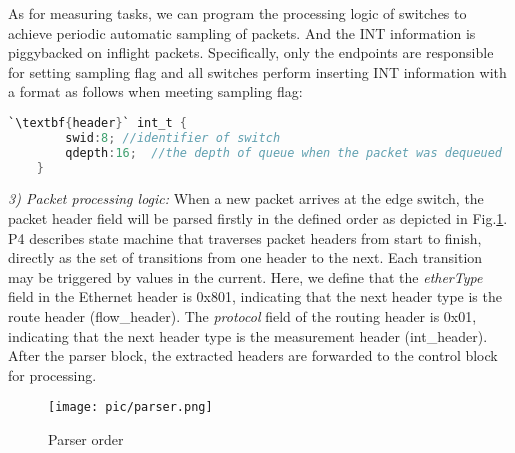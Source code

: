 \documentclass[10pt,conference]{IEEEtran}
\begin{document}
As for measuring tasks, we can program the processing logic of switches to achieve periodic automatic sampling of packets. And the INT information is piggybacked on inflight packets. Specifically, only the endpoints are responsible for setting sampling flag and all switches perform inserting INT information with a format as follows when meeting sampling flag:

\begin{lstlisting}[breaklines,columns=flexible,basicstyle=\footnotesize,language={C},tabsize=4,keywordstyle=\bfseries,stringstyle=\ttfamily,escapeinside=``,commentstyle=\color{red!50!green!50!blue!50},showstringspaces=false]
	`\textbf{header}` int_t {
		swid:8; //identifier of switch
		qdepth:16;	//the depth of queue when the packet was dequeued
	}
\end{lstlisting}

\emph{3) Packet processing logic:} When a new packet arrives at the edge switch, the packet header field will be parsed firstly in the defined order as depicted in Fig.\ref{parser}. P4 describes state machine that traverses packet headers from start to finish, directly as the set of transitions from one header to the next. Each transition may be triggered by values in the current. Here, we define that the \emph{etherType} field in the Ethernet header is 0x801, indicating that the next header type is the route header (flow\_header). The \emph{protocol} field of the routing header is 0x01, indicating that the next header type is the measurement header (int\_header). After the parser block, the extracted headers are forwarded to the control block for processing.
\begin{figure}[t]
\centerline{\texttt{[image: pic/parser.png]}}
\caption{Parser order}
\label{parser}
\end{figure}
\end{document}
